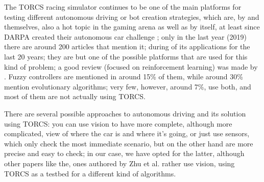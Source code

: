\documentclass[10pt,journal,compsoc]{IEEEtran}
\begin{document}







The TORCS racing simulator continues to be one of the main platforms
for testing different autonomous driving or bot creation strategies,
which are, by and themselves, also a hot topic in the gaming arena as
well as by itself, at least since DARPA created their autonomous car
challenge \cite{badue2019selfdriving};
only in the last year (2019) there are around 200 articles that
mention it; during  \cite{schiavullo2019torcs} of its
applications for the last 20 years; they are but one of the possible
platforms that are used for this kind of problem; a good review
(focused on reinforcement learning) was made by
\cite{abuzekry2comparative}. Fuzzy controllers are mentioned in around
15\% of them, while around 30\% mention evolutionary algorithms; very
few, however, around 7\%, use both, and most of them are not actually
using TORCS.

There are several possible approaches to autonomous driving and its
solution using TORCS: you can use vision to have more complete,
although more complicated, view of where the car is and where it's
going, or just use sensors, which only check the most immediate
scenario, but on the other hand are more precise and easy to check; in
our case, we have opted for the latter, although other papers like the,
ones authored by Zhu et al. \cite{zhu2018driving,zhu2019vision,neurone} rather
use vision, using TORCS as a testbed for a different kind of algorithms.
\end{document}
